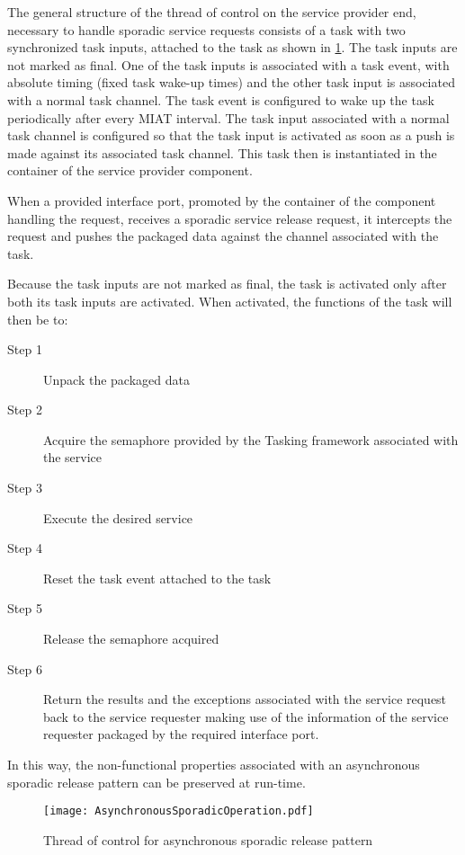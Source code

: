 The general structure of the thread of control on the service provider end, necessary to handle sporadic service requests consists of a task with two synchronized task inputs, attached to the task as shown in \cref{fig: Asynchronous sporadic}. The task inputs are not marked as final. One of the task inputs is associated with a task event, with absolute timing (fixed task wake-up times) and the other task input is associated with a normal task channel. The task event is configured to wake up the task periodically after every MIAT interval. The task input associated with a normal task channel is configured so that the task input is activated as soon as a push is made against its associated task channel. This task then is instantiated in the container of the service provider component.   

When a provided interface port, promoted by the container of the component handling the request, receives a sporadic service release request, it intercepts the request and pushes the packaged data against the channel associated with the task. 

Because the task inputs are not marked as final, the task is activated only after both its task inputs are activated. When activated, the functions of the task will then be to:
 
\begin{description}
\item [Step 1] Unpack the packaged data
\item [Step 2] Acquire the semaphore provided by the Tasking framework associated with the service
\item [Step 3] Execute the desired service
\item [Step 4] Reset the task event attached to the task
\item [Step 5] Release the semaphore acquired 
\item [Step 6] Return the results and the exceptions associated with the service request back to the service requester making use of the information of the service requester packaged by the required interface port. 
\end{description}

In this way, the non-functional properties associated with an asynchronous sporadic release pattern can be preserved at run-time.

\begin{figure}[h]
	\centering
	\texttt{[image: AsynchronousSporadicOperation.pdf]}
	\caption{Thread of control for asynchronous sporadic release pattern}
	\label{fig: Asynchronous sporadic}
\end{figure}

